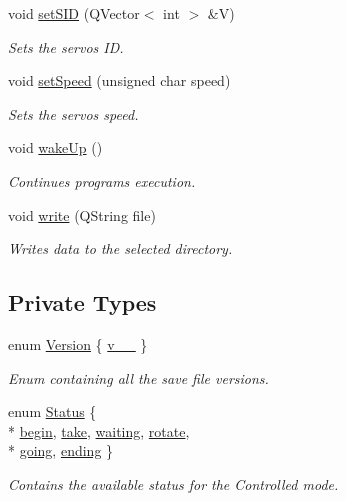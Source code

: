 \begin{DoxyCompactItemize}
void \hyperlink{a00009_ac3471e5020f5d9babd3f2ff7b3b82aca}{set\+S\+I\+D} (Q\+Vector$<$ int $>$ \&V)
\begin{DoxyCompactList}\small\item\em Sets the servos I\+D. \end{DoxyCompactList}\item 
void \hyperlink{a00009_a906ea2c67acbffb3e8dedabc03288992}{set\+Speed} (unsigned char speed)
\begin{DoxyCompactList}\small\item\em Sets the servos speed. \end{DoxyCompactList}\item 
void \hyperlink{a00009_a5f32574f843d76deffec45995028389b}{wake\+Up} ()
\begin{DoxyCompactList}\small\item\em Continues program\textquotesingle{}s execution. \end{DoxyCompactList}\item 
void \hyperlink{a00009_aca68fe85a100a052c4d41f0fa88cc152}{write} (Q\+String file)
\begin{DoxyCompactList}\small\item\em Writes data to the selected directory. \end{DoxyCompactList}\end{DoxyCompactItemize}
\subsection*{Private Types}
\begin{DoxyCompactItemize}
\item 
enum \hyperlink{a00009_aeccce0ac6a969e2ee7cbe91687e2d085}{Version} \{ \hyperlink{a00009_aeccce0ac6a969e2ee7cbe91687e2d085a319b6bf2cb120faeefbd0a5118ece7e3}{v\+\_\+\_}
 \}
\begin{DoxyCompactList}\small\item\em Enum containing all the save file versions. \end{DoxyCompactList}\item 
enum \hyperlink{a00009_a3c23985ab5e94c14f5e6fca0a9338f9c}{Status} \{ \\*
\hyperlink{a00009_a3c23985ab5e94c14f5e6fca0a9338f9ca1dad1d6f2c4b2b0a2eb62a938a9e7f51}{begin}, 
\hyperlink{a00009_a3c23985ab5e94c14f5e6fca0a9338f9caf04ef179dc6409795e9d3ade571c3515}{take}, 
\hyperlink{a00009_a3c23985ab5e94c14f5e6fca0a9338f9caaddba813e34d7dd76102738562a90054}{waiting}, 
\hyperlink{a00009_a3c23985ab5e94c14f5e6fca0a9338f9ca78f8ef8a596e79d3e778ef9052461658}{rotate}, 
\\*
\hyperlink{a00009_a3c23985ab5e94c14f5e6fca0a9338f9cac8deab3874847d5e02a4593a81de8ba3}{going}, 
\hyperlink{a00009_a3c23985ab5e94c14f5e6fca0a9338f9ca08a8e15b95d1cf505aab103927b3f832}{ending}
 \}
\begin{DoxyCompactList}\small\item\em Contains the available status for the Controlled mode. \end{DoxyCompactList}\end{DoxyCompactItemize}
